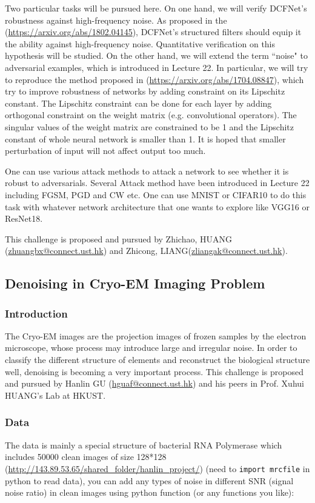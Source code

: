 \documentclass[11pt]{article}
\begin{document}
Two particular tasks will be pursued here. On one hand, we will verify DCFNet's robustness against high-frequency noise. As proposed in the (\href{https://arxiv.org/abs/1802.04145}{https://arxiv.org/abs/1802.04145}), DCFNet's structured filters should equip it the ability against high-frequency noise. Quantitative verification on this hypothesis will be studied. On the other hand, we will extend the term ``noise" to adversarial examples, which is introduced in Lecture 22. In particular, we will try to reproduce the method proposed in (\url{https://arxiv.org/abs/1704.08847}), which try to improve robustness of networks by adding constraint on its Lipschitz constant. The Lipschitz constraint can be done for each layer by adding orthogonal constraint on the weight matrix (e.g. convolutional operators). The singular values of the weight matrix are constrained to be 1 and the Lipschitz constant of whole neural network is smaller than 1. It is hoped that smaller perturbation of input will not affect output too much.

One can use various attack methods to attack a network to see whether it is robust to adversarials. Several Attack method have been introduced in Lecture 22 including FGSM, PGD and CW etc. One can use MNIST or CIFAR10 to do this task with whatever network architecture that one wants to explore like VGG16 or ResNet18.

This challenge is proposed and pursued by Zhichao, HUANG (\url{zhuangbx@connect.ust.hk}) and Zhicong, LIANG(\url{zliangak@connect.ust.hk}).

\subsection{Denoising in Cryo-EM Imaging Problem}
\subsubsection{Introduction}
The Cryo-EM images are the projection images of frozen samples by the electron microscope, whose process may introduce large and irregular noise. In order to classify the different structure of elements and reconstruct the biological structure well, denoising is becoming a very important process. This challenge is proposed and pursued by Hanlin GU (\url{hguaf@connect.ust.hk}) and his peers in Prof. Xuhui HUANG's Lab at HKUST. 

\subsubsection{Data}
The data is mainly a special structure of bacterial RNA Polymerase which includes 50000 clean images of size 128*128 (\url{http://143.89.53.65/shared_folder/hanlin_project/}) (need to \texttt{import mrcfile} in python to read data), you can add any types of noise in different SNR (signal noise ratio) in clean images using python function (or any functions you like):
\end{document}
